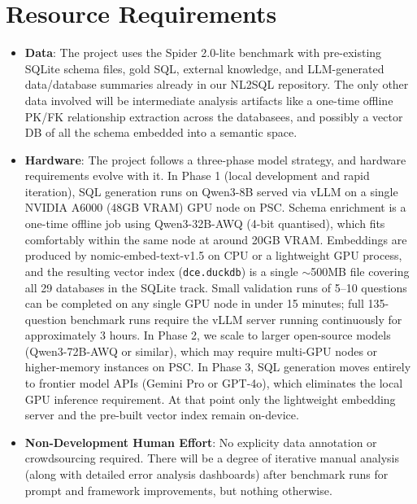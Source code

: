 \section{Resource Requirements}
\begin{itemize}
    \item \textbf{Data}: The project uses the Spider 2.0-lite benchmark with pre-existing SQLite schema files, gold SQL, external knowledge, and LLM-generated data/database summaries already in our NL2SQL repository. The only other data involved will be intermediate analysis artifacts like a one-time offline PK/FK relationship extraction across the databasees, and possibly a vector DB of all the schema embedded into a semantic space.
    \item \textbf{Hardware}: The project follows a three-phase model strategy, and hardware requirements evolve with it. In Phase 1 (local development and rapid iteration), SQL generation runs on Qwen3-8B served via vLLM on a single NVIDIA A6000 (48GB VRAM) GPU node on PSC. Schema enrichment is a one-time offline job using Qwen3-32B-AWQ (4-bit quantised), which fits comfortably within the same node at around 20GB VRAM. Embeddings are produced by nomic-embed-text-v1.5 on CPU or a lightweight GPU process, and the resulting vector index (\texttt{dce.duckdb}) is a single $\sim$500MB file covering all 29 databases in the SQLite track. Small validation runs of 5--10 questions can be completed on any single GPU node in under 15 minutes; full 135-question benchmark runs require the vLLM server running continuously for approximately 3 hours. In Phase 2, we scale to larger open-source models (Qwen3-72B-AWQ or similar), which may require multi-GPU nodes or higher-memory instances on PSC. In Phase 3, SQL generation moves entirely to frontier model APIs (Gemini Pro or GPT-4o), which eliminates the local GPU inference requirement. At that point only the lightweight embedding server and the pre-built vector index remain on-device.
    \item \textbf{Non-Development Human Effort}: No explicity data annotation or crowdsourcing required. There will be a degree of iterative manual analysis (along with detailed error analysis dashboards) after benchmark runs for prompt and framework improvements, but nothing otherwise.

\end{itemize}

